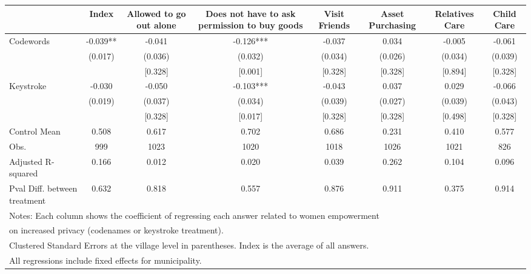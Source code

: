 {
\def\sym#1{\ifmmode^{#1}\else\(^{#1}\)\fi}
\begin{tabular}{l*{7}{c}}
\toprule
                &\multicolumn{1}{c}{Index}&\multicolumn{1}{c}{Allowed to go out alone}&\multicolumn{1}{c}{Does not have to ask permission to buy goods}&\multicolumn{1}{c}{Visit Friends}&\multicolumn{1}{c}{Asset Purchasing}&\multicolumn{1}{c}{Relatives Care}&\multicolumn{1}{c}{Child Care}\\
\midrule
Codewords       &   -0.039** &   -0.041   &   -0.126***&   -0.037   &    0.034   &   -0.005   &   -0.061   \\
                &  (0.017)   &  (0.036)   &  (0.032)   &  (0.034)   &  (0.026)   &  (0.034)   &  (0.039)   \\
                &            &  [0.328]   &  [0.001]   &  [0.328]   &  [0.328]   &  [0.894]   &  [0.328]   \\
Keystroke       &   -0.030   &   -0.050   &   -0.103***&   -0.043   &    0.037   &    0.029   &   -0.066   \\
                &  (0.019)   &  (0.037)   &  (0.034)   &  (0.039)   &  (0.027)   &  (0.039)   &  (0.043)   \\
                &            &  [0.328]   &  [0.017]   &  [0.328]   &  [0.328]   &  [0.498]   &  [0.328]   \\
\midrule
Control Mean    &    0.508   &    0.617   &    0.702   &    0.686   &    0.231   &    0.410   &    0.577   \\
Obs.            &      999   &     1023   &     1020   &     1018   &     1026   &     1021   &      826   \\
Adjusted R-squared&    0.166   &    0.012   &    0.020   &    0.039   &    0.262   &    0.104   &    0.096   \\
Pval Diff. between treatment&    0.632   &    0.818   &    0.557   &    0.876   &    0.911   &    0.375   &    0.914   \\
\bottomrule
\multicolumn{8}{l}{\footnotesize Notes: Each column shows the coefficient of regressing each answer related to women empowerment}\\
\multicolumn{8}{l}{\footnotesize on increased privacy (codenames or keystroke treatment).}\\
\multicolumn{8}{l}{\footnotesize Clustered Standard Errors at the village level in parentheses. Index is the average of all answers.}\\
\multicolumn{8}{l}{\footnotesize All regressions include fixed effects for municipality.}\\

\end{tabular}}
